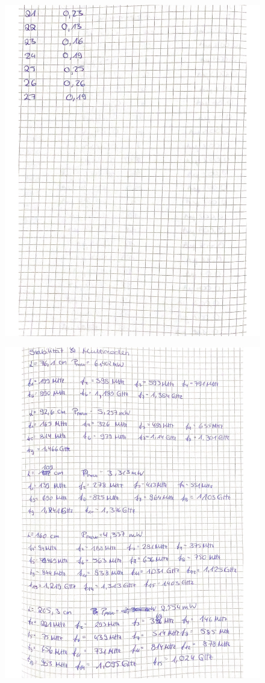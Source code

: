 \begin{figure}[H]
  \centering
  \includegraphics[width=\textwidth]{"Messwerte/V61Messdaten_07.pdf"}
  \label{fig:Messungen_7}
\end{figure}

\begin{figure}[H]
  \centering
  \includegraphics[width=\textwidth]{"Messwerte/V61Messwerte_08.pdf"}
  \label{fig:Messungen_8}
\end{figure}
  
